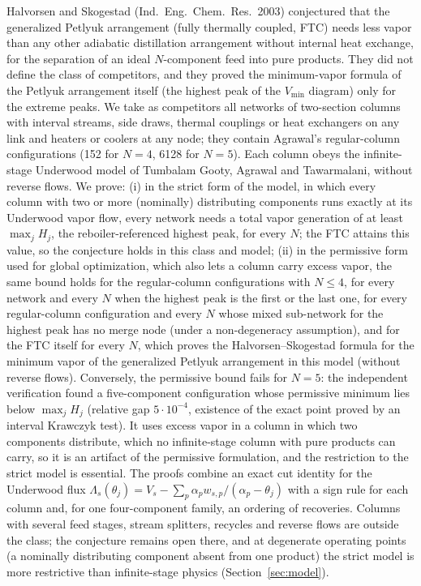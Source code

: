 \documentclass[11pt,a4paper]{report}
\newcommand{\Lam}{\Lambda}
\begin{document}
\makepapertitle

\begin{paperabstract}
Halvorsen and Skogestad (Ind.\ Eng.\ Chem.\ Res.\ 2003) conjectured that the generalized Petlyuk arrangement
(fully thermally coupled, FTC) needs less vapor than any other adiabatic distillation arrangement without internal
heat exchange, for the separation of an ideal $N$-component feed into pure products. They did not define the class
of competitors, and they proved the minimum-vapor formula of the Petlyuk arrangement itself (the highest peak of the
$V_{\min}$ diagram) only for the extreme peaks. We take as competitors all networks of two-section columns with
interval streams, side draws, thermal couplings or heat exchangers on any link and heaters or coolers at any node; they
contain Agrawal's regular-column configurations (152 for $N=4$, 6128 for $N=5$). Each column obeys the
infinite-stage Underwood model of Tumbalam Gooty, Agrawal and Tawarmalani, without reverse flows. We prove: (i) in the
strict form of the model, in which every column with two or more (nominally) distributing components runs exactly at
its Underwood vapor flow, every
network needs a total vapor generation of at least $\max_j H_j$, the reboiler-referenced highest peak, for every $N$;
the FTC attains this value, so the conjecture holds in this class and model; (ii) in the permissive form used for global
optimization, which also lets a column carry excess vapor, the same bound holds for the regular-column configurations
with $N\le4$, for every network and every $N$ when the highest peak is the first or the last one, for every regular-column
configuration and every $N$ whose mixed sub-network for the highest peak has no merge node (under a non-degeneracy
assumption), and for the FTC itself for every $N$, which proves the Halvorsen--Skogestad formula for the minimum vapor of
the generalized Petlyuk arrangement in this model (without reverse flows). Conversely, the permissive bound fails for
$N=5$: the independent verification found a five-component configuration whose permissive minimum lies below
$\max_jH_j$ (relative gap $5\cdot10^{-4}$, existence of the exact point proved by an interval Krawczyk test). It uses
excess vapor in a column in which two components distribute, which no infinite-stage column with pure products can
carry, so it is an artifact of the permissive formulation, and the restriction to the strict model is essential. The proofs combine an exact cut identity for the
Underwood flux $\Lam_s(\theta_j)=V_s-\sum_p\alpha_p w_{s,p}/(\alpha_p-\theta_j)$ with a sign rule for each column and,
for one four-component family, an ordering of recoveries. Columns with several feed stages, stream splitters,
recycles and reverse flows are outside the class; the conjecture remains open there, and at degenerate operating
points (a nominally distributing component absent from one product) the strict model is more restrictive than
infinite-stage physics (Section~\ref{sec:model}).
\end{paperabstract}
\end{document}
